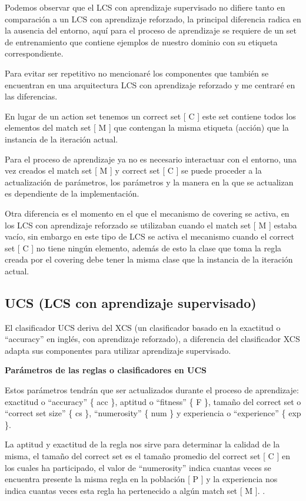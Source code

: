 \documentclass[11pt,fleqn]{book} %
\begin{document}
Podemos observar que el LCS con aprendizaje supervisado no difiere tanto en comparación a un LCS con aprendizaje reforzado, la principal diferencia radica en la ausencia del entorno, aquí para el proceso de aprendizaje se requiere de un set de entrenamiento que contiene ejemplos de nuestro dominio con su etiqueta correspondiente.

Para evitar ser repetitivo no mencionaré los componentes que también se encuentran en una arquitectura LCS con aprendizaje reforzado y me centraré en las diferencias.

En lugar de un action set tenemos un correct set [ C ] este set contiene todos los elementos del match set [ M ] que contengan la misma etiqueta (acción) que la instancia de la iteración actual.

Para el proceso de aprendizaje ya no es necesario interactuar con el entorno, una vez creados el match set [ M ] y correct set [ C ] se puede proceder a la actualización de parámetros, los parámetros y la manera en la que se actualizan es dependiente de la implementación.

Otra diferencia es el momento en el que el mecanismo de covering se activa, en los LCS con aprendizaje reforzado se utilizaban cuando el match set [ M ] estaba vacío, sin embargo en este tipo de LCS se activa el mecanismo cuando el correct set [ C ] no tiene ningún elemento, además de esto la clase que toma la regla creada por el covering debe tener la misma clase que la instancia de la iteración actual.

\subsection{UCS (LCS con aprendizaje supervisado)} 

El clasificador UCS deriva del XCS (un clasificador basado en la exactitud o “accuracy” en inglés, con aprendizaje reforzado), a diferencia del clasificador XCS adapta sus componentes para utilizar aprendizaje supervisado.

\textbf{Parámetros de las reglas o clasificadores en UCS}

Estos parámetros tendrán que ser actualizados durante el proceso de aprendizaje: exactitud o “accuracy” \{ acc \}, aptitud o “fitness” \{ F \}, tamaño del correct set o “correct set size” \{ cs \}, “numerosity” \{ num \} y experiencia o “experience” \{ exp \}.

La aptitud y exactitud de la regla nos sirve para determinar la calidad de la misma, el tamaño del correct set es el tamaño promedio del correct set [ C ] en los cuales ha participado, el valor de “numerosity” indica cuantas veces se encuentra presente la misma regla en la población [ P ] y la experiencia nos indica cuantas veces esta regla ha pertenecido a algún match set [ M ]. \cite{orriols2006further}.
\end{document}
